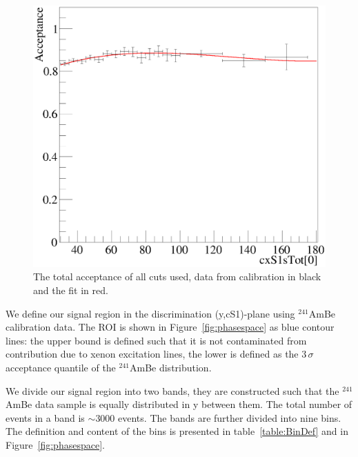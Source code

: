 \begin{figure}[t!]
\begin{minipage}{0.9\linewidth}
\centerline{\includegraphics[width=1.\linewidth]{Figures/Acceptance.eps}}
\end{minipage}
\caption{The total acceptance of all cuts used, data from calibration in black and the fit in red.}
\label{fig:Acc}
\end{figure}

We define our signal region in the discrimination (y,cS1)-plane using $^{241}$AmBe calibration data. 
The ROI is shown in Figure~\ref{fig:phasespace} as blue contour lines: the upper bound is defined such that it is not contaminated from contribution due to xenon excitation lines, the lower is defined as the 3\,$\sigma$ acceptance quantile of the $^{241}$AmBe distribution.

We divide our signal region into two bands, they are constructed such that the $^{241}$AmBe data sample is equally distributed in y between them. The total number of events in a band is $\sim3000$ events. The bands are further divided into nine bins. The definition and content of the bins is presented in table~\ref{table:BinDef} and in Figure~\ref{fig:phasespace}. 



